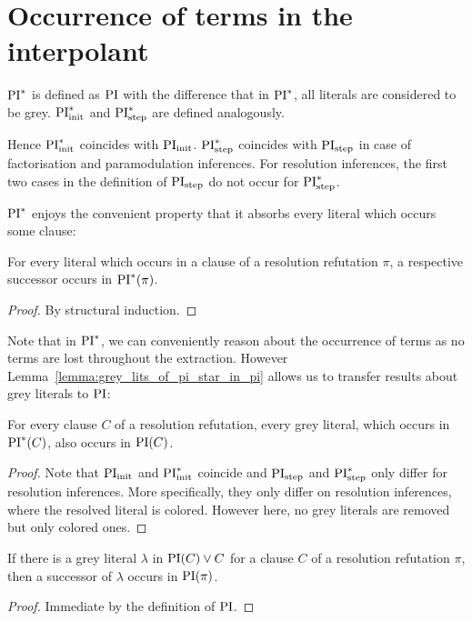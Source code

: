 \documentclass[,%
	draft=false,%
	numbers=noendperiod
	12pt,
	a4paper,
	oneside,%
	openany,
]{memoir}
\begin{document}
\section{Occurrence of terms in the interpolant}


\begin{defi}[$\PI^*$]
	$\PI^*$ is defined as $\operatorname{PI}$ with the difference that in $\PI^*$, all literals are considered to be grey.
	$\operatorname{PI}_{\mathrm{init}}^*$ and $\operatorname{PI}_{\mathrm{step}}^*$ are defined analogously.
\end{defi}

Hence $\operatorname{PI}_{\mathrm{init}}^*$ coincides with $\operatorname{PI}_{\mathrm{init}}$.
$\operatorname{PI}_{\mathrm{step}}^*$ coincides with $\operatorname{PI}_{\mathrm{step}}$ in case of factorisation and paramodulation inferences.
For resolution inferences, the first two cases in the definition of $\operatorname{PI}_{\mathrm{step}}$ do not occur for $\operatorname{PI}_{\mathrm{step}}^*$.

$\PI^*$ enjoys the convenient property that it absorbs every literal which occurs some clause:

\begin{prop}
	\label{prop:every_lit_in_pi_star}
	For every literal which occurs in a clause of a resolution refutation $\pi$, a respective successor occurs in $\operatorname{PI}^*(\pi)$.
\end{prop}
\begin{proof}
	By structural induction.
\end{proof}

Note that in $\PI^*$, we can conveniently reason about the occurrence of terms as no terms are lost throughout the extraction.
However Lemma~\ref{lemma:grey_lits_of_pi_star_in_pi} allows us to transfer results about grey literals to $\operatorname{PI}$:

\begin{lemma}
	\label{lemma:grey_lits_of_pi_star_in_pi}
	For every clause $C$ of a resolution refutation,
	every grey literal, which occurs in $\operatorname{PI}^*(C)$, also occurs in $\operatorname{PI}(C)$.
\end{lemma}
\begin{proof}
	Note that $\operatorname{PI}_{\mathrm{init}}$ and $\operatorname{PI}_{\mathrm{init}}^*$ coincide and $\operatorname{PI}_{\mathrm{step}}$ and $\operatorname{PI}_{\mathrm{step}}^*$ only differ for resolution inferences.
	More specifically, they only differ on resolution inferences, where the resolved literal is colored. However here, no grey literals are removed but only colored ones.
\end{proof}


\begin{lemma}
	\label{lemma:grey_lits_all_in_PI}
	If there is a grey literal $\lambda$ in $\operatorname{PI}(C) \lor C$ for a clause $C$ of a resolution refutation $\pi$,
	then a successor of $\lambda$ occurs in $\operatorname{PI}(\pi)$.
\end{lemma}
\begin{proof}
	Immediate by the definition of $\operatorname{PI}$.
\end{proof}
\end{document}
